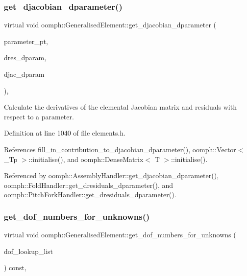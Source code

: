 \subsubsection{\texorpdfstring{get\+\_\+djacobian\+\_\+dparameter()}{get\_djacobian\_dparameter()}}
{\footnotesize\ttfamily virtual void oomph\+::\+Generalised\+Element\+::get\+\_\+djacobian\+\_\+dparameter (\begin{DoxyParamCaption}\item[{double $\ast$const \&}]{parameter\+\_\+pt,  }\item[{\hyperlink{classoomph_1_1Vector}{Vector}$<$ double $>$ \&}]{dres\+\_\+dparam,  }\item[{\hyperlink{classoomph_1_1DenseMatrix}{Dense\+Matrix}$<$ double $>$ \&}]{djac\+\_\+dparam }\end{DoxyParamCaption})\hspace{0.3cm}{\ttfamily [inline]}, {\ttfamily [virtual]}}



Calculate the derivatives of the elemental Jacobian matrix and residuals with respect to a parameter. 



Definition at line 1040 of file elements.\+h.



References fill\+\_\+in\+\_\+contribution\+\_\+to\+\_\+djacobian\+\_\+dparameter(), oomph\+::\+Vector$<$ \+\_\+\+Tp $>$\+::initialise(), and oomph\+::\+Dense\+Matrix$<$ T $>$\+::initialise().



Referenced by oomph\+::\+Assembly\+Handler\+::get\+\_\+djacobian\+\_\+dparameter(), oomph\+::\+Fold\+Handler\+::get\+\_\+dresiduals\+\_\+dparameter(), and oomph\+::\+Pitch\+Fork\+Handler\+::get\+\_\+dresiduals\+\_\+dparameter().

\mbox{\label{classoomph_1_1GeneralisedElement_a069f59bfc3e607a5bebba52c6314d777}} 
\subsubsection{\texorpdfstring{get\+\_\+dof\+\_\+numbers\+\_\+for\+\_\+unknowns()}{get\_dof\_numbers\_for\_unknowns()}}
{\footnotesize\ttfamily virtual void oomph\+::\+Generalised\+Element\+::get\+\_\+dof\+\_\+numbers\+\_\+for\+\_\+unknowns (\begin{DoxyParamCaption}\item[{std\+::list$<$ std\+::pair$<$ unsigned long, unsigned $>$ $>$ \&}]{dof\+\_\+lookup\+\_\+list }\end{DoxyParamCaption}) const\hspace{0.3cm}{\ttfamily [inline]}, {\ttfamily [virtual]}}



